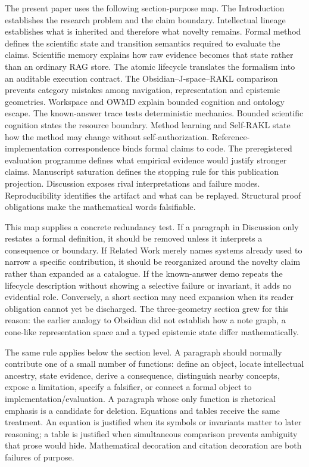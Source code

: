 The present paper uses the following section-purpose map. The Introduction establishes the research problem and the claim boundary. Intellectual lineage establishes what is inherited and therefore what novelty remains. Formal method defines the scientific state and transition semantics required to evaluate the claims. Scientific memory explains how raw evidence becomes that state rather than an ordinary RAG store. The atomic lifecycle translates the formalism into an auditable execution contract. The Obsidian--J-space--RAKL comparison prevents category mistakes among navigation, representation and epistemic geometries. Workspace and OWMD explain bounded cognition and ontology escape. The known-answer trace tests deterministic mechanics. Bounded scientific cognition states the resource boundary. Method learning and Self-RAKL state how the method may change without self-authorization. Reference-implementation correspondence binds formal claims to code. The preregistered evaluation programme defines what empirical evidence would justify stronger claims. Manuscript saturation defines the stopping rule for this publication projection. Discussion exposes rival interpretations and failure modes. Reproducibility identifies the artifact and what can be replayed. Structural proof obligations make the mathematical words falsifiable.

This map supplies a concrete redundancy test. If a paragraph in Discussion only restates a formal definition, it should be removed unless it interprets a consequence or boundary. If Related Work merely names systems already used to narrow a specific contribution, it should be reorganized around the novelty claim rather than expanded as a catalogue. If the known-answer demo repeats the lifecycle description without showing a selective failure or invariant, it adds no evidential role. Conversely, a short section may need expansion when its reader obligation cannot yet be discharged. The three-geometry section grew for this reason: the earlier analogy to Obsidian did not establish how a note graph, a cone-like representation space and a typed epistemic state differ mathematically.

The same rule applies below the section level. A paragraph should normally contribute one of a small number of functions: define an object, locate intellectual ancestry, state evidence, derive a consequence, distinguish nearby concepts, expose a limitation, specify a falsifier, or connect a formal object to implementation/evaluation. A paragraph whose only function is rhetorical emphasis is a candidate for deletion. Equations and tables receive the same treatment. An equation is justified when its symbols or invariants matter to later reasoning; a table is justified when simultaneous comparison prevents ambiguity that prose would hide. Mathematical decoration and citation decoration are both failures of purpose.

